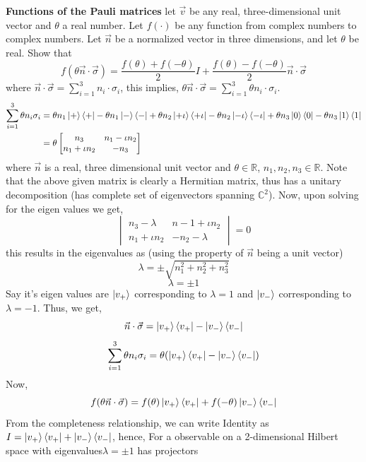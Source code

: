 \begin{example}
    \textbf{Functions of the Pauli matrices} let $\vec{v}$ be any real, three-dimensional unit vector and $\theta$ a real number. Let $f(\cdot)$ be any function from complex numbers to complex numbers. Let $\vec{n}$ be a normalized vector in three dimensions, and let $\theta$ be real. Show that
    \[
    f(\theta \vec{n} \cdot \vec{\sigma})=\frac{f(\theta)+f(-\theta)}{2}I+\frac{f(\theta)-f(-\theta)}{2}\vec{n}\cdot \vec{\sigma}
    \]
    where $\vec{n}\cdot\vec{\sigma}=\sum_{i=1}^3 n_i\cdot\sigma_i$, this implies, $\theta\vec{n}\cdot\vec{\sigma}=\sum_{i=1}^3 \theta n_i\cdot\sigma_i$.
    \begin{align*}
    \sum_{i=1}^3 \theta n_i\sigma_i &= \theta n_1 \ket{+}\bra{+}-\theta n_1\ket{-}\bra{-}+\theta n_2\ket{+\iota}\bra{+\iota}-\theta n_2\ket{-\iota}\bra{-\iota} + \theta n_3\ket{0}\bra{0}-\theta n_3\ket{1}\bra{1}\\
    &=\theta \begin{bmatrix} n_3 & n_1-\iota n_2 \\ n_1 + \iota n_2 & -n_3 \end{bmatrix}
    \end{align*}
    where $\vec{n}$ is a real, three dimensional unit vector and $\theta \in \mathbb{R}$, $n_1,n_2,n_3 \in \mathbb{R}$. Note that the above given matrix is clearly a Hermitian matrix, thus has a unitary decomposition (has complete set of eigenvectors spanning $\mathbb{C}^2$). Now, upon solving for the eigen values we get,
    \[
    \begin{vmatrix} n_3 - \lambda & n-1+\iota n_2  \\ n_1+\iota n_2 & -n_2-\lambda \end{vmatrix} = 0
    \]
    this results in the eigenvalues as (using the property of $\vec{n}$ being a unit vector)
    \[
    \lambda=\pm\sqrt{n_1^2+n_2^2+n_3^2}
    \]
    \[
    \lambda=\pm 1
    \]
    Say it's eigen values are $\ket{v_+}$ corresponding to $\lambda=1$ and $\ket{v_-}$ corresponding to $\lambda=-1$. Thus, we get,
    \[
    \vec{n}\cdot\vec{\sigma}=\ket{v_+}\bra{v_+}-\ket{v_-}\bra{v_-}
    \]
    \[
    \sum_{i=1}^3 \theta n_i\sigma_i=\theta (\ket{v_+}\bra{v_+} - \ket{v_-}\bra{v_-})
    \]
    Now,
    \[
    f(\theta \vec{n}\cdot\vec{\sigma})=f(\theta)\ket{v_+}\bra{v_+}+f(-\theta)\ket{v_-}\bra{v_-}
    \]
    From the completeness relationship, we can write Identity as $I=\ket{v_+}\bra{v_+}+\ket{v_-}\bra{v_-}$, hence, For a observable on a 2-dimensional Hilbert space with eigenvalues$\lambda=\pm 1$ has projectors

\end{example}
